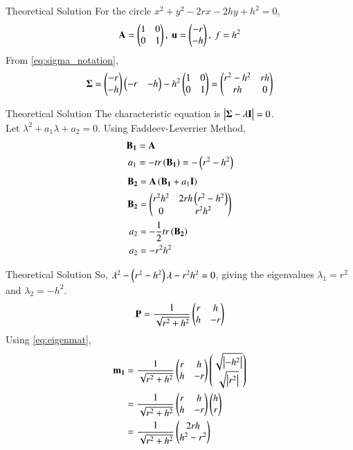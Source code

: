 \documentclass{beamer}
\begin{document}
\begin{frame}{Theoretical Solution}
    For the circle $x^2+y^2-2rx-2hy+h^2=0$,
\begin{align}
    \mathbf{A} = \begin{pmatrix}1 & 0 \\ 0 & 1\end{pmatrix},\text{ }\mathbf{u} = \begin{pmatrix}-r \\ -h\end{pmatrix},\text{ }f = h^2
\end{align}
From \eqref{eq:sigma_notation},
\begin{align}
    \mathbf{\Sigma} = \begin{pmatrix}-r \\ -h\end{pmatrix}\begin{pmatrix}-r & -h\end{pmatrix} - h^2\begin{pmatrix}1 & 0 \\ 0 & 1\end{pmatrix} = \begin{pmatrix}r^2-h^2 & rh \\ rh & 0\end{pmatrix}
\end{align}
\end{frame}

\begin{frame}{Theoretical Solution}
    The characteristic equation is $\begin{vmatrix}\mathbf{\Sigma}-\lambda\mathbf{I}\end{vmatrix}=0$. \\
Let $\lambda^2 + a_1 \lambda + a_2 = 0$. Using Faddeev-Leverrier Method,
\begin{align}
    \mathbf{B_1} &= \mathbf{A} \\
    a_1 &= - tr\left(\mathbf{B_1}\right) = -\left(r^2-h^2\right)
\end{align}
\begin{align}
    \mathbf{B_2} &= \mathbf{A}\left(\mathbf{B_1} + a_1\mathbf{I}\right) \\
    \mathbf{B_2} &= \begin{pmatrix}r^2h^2 & 2rh\left(r^2-h^2\right) \\ 0 & r^2h^2\end{pmatrix} \\
    a_2 &= -\frac{1}{2}tr\left(\mathbf{B_2}\right) \\
    a_2 &= -r^2h^2
\end{align}
\end{frame}

\begin{frame}{Theoretical Solution}
So, $\lambda^2 - \left(r^2-h^2\right)\lambda - r^2h^2 = 0$, giving the eigenvalues $\lambda_1 = r^2$ and $\lambda_2 = -h^2$.
\begin{align}
    \mathbf{P} = \frac{1}{\sqrt{r^2+h^2}}\begin{pmatrix}r & h \\ h & -r\end{pmatrix}
\end{align}
Using \eqref{eq:eigenmat},
\begin{align}
    \mathbf{m_1} &= \frac{1}{\sqrt{r^2+h^2}}\begin{pmatrix}r & h \\ h & -r\end{pmatrix}\begin{pmatrix}\sqrt{\left\vert-h^2\right\vert} \\ \sqrt{\left\vert r^2\right\vert}\end{pmatrix} \\
    &= \frac{1}{\sqrt{r^2+h^2}}\begin{pmatrix}r & h \\ h & -r\end{pmatrix}\begin{pmatrix}h \\ r\end{pmatrix} \\
    &= \frac{1}{\sqrt{r^2+h^2}}\begin{pmatrix}2rh \\ h^2-r^2\end{pmatrix} \label{eq:equation1}
\end{align}
\end{frame}
\end{document}
